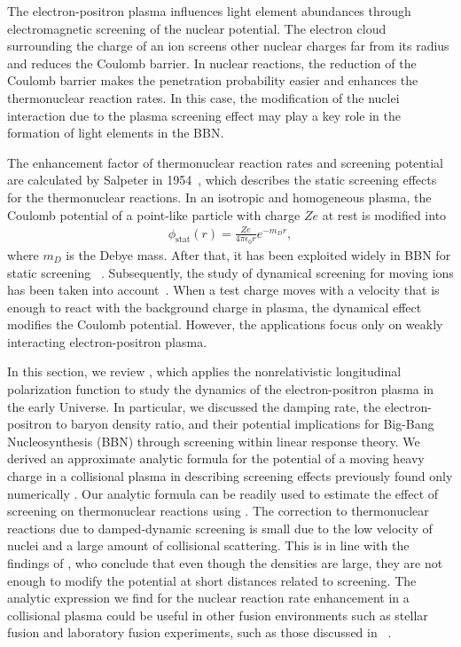 The electron-positron plasma influences light element abundances through electromagnetic screening of the nuclear potential. The electron cloud surrounding the charge of an ion screens other nuclear charges far from its radius and reduces the Coulomb barrier. In nuclear reactions, the reduction of the Coulomb barrier makes the penetration probability easier and enhances the thermonuclear reaction rates. In this case, the modification of the nuclei interaction due to the plasma screening effect may play a key role in the formation of light elements in the BBN. 

The enhancement factor of thermonuclear reaction rates and screening potential are calculated by Salpeter in 1954~\cite{Salpeter:1954nc}, which describes the static screening effects for the thermonuclear reactions. In an isotropic and homogeneous plasma, the Coulomb potential of a point-like particle with charge $Ze$ at rest is modified into~\cite{Salpeter:1954nc}
\begin{align}
\phi_\text{stat}(r)=\frac{Ze}{4\pi\epsilon_0 r}e^{-m_Dr},
\end{align}
where $m_D$ is the Debye mass. After that, it has been exploited widely in BBN for static screening ~\cite{1969ApJ...155..183S,Famiano:2016hhs}. Subsequently, the study of dynamical screening for moving ions has been taken into account~\cite{Carraro:1988apj,Gruzinov:1997as,Hwang:2021kno}. When a test charge moves with a velocity that is enough to react with the background charge in plasma, the dynamical effect modifies the Coulomb potential. However, the applications focus only on weakly interacting electron-positron plasma. 


In this section, we review \cite{Grayson:2023flr}, which applies the nonrelativistic longitudinal polarization function to study the dynamics of the electron-positron plasma in the early Universe. In particular, we discussed the damping rate, the electron-positron to baryon density ratio, and their potential implications for Big-Bang Nucleosynthesis (BBN) through screening within linear response theory. We derived an approximate analytic formula for the potential of a moving heavy charge in a collisional plasma in  describing screening effects previously found only numerically \cite{Hwang:2021kno}. Our analytic formula can be readily used to estimate the effect of screening on thermonuclear reactions using . The correction to thermonuclear reactions due to damped-dynamic screening is small due to the low velocity of nuclei and a large amount of collisional scattering. This is in line with the findings of \cite{Hwang:2021kno}, who conclude that even though the densities are large, they are not enough to modify the potential at short distances related to screening. The analytic expression we find for the nuclear reaction rate enhancement  in a collisional plasma could be useful in other fusion environments such as stellar fusion and laboratory fusion experiments, such as those discussed in ~\cite{Labaune:2013dla,Margarone:2022mdpi}.

